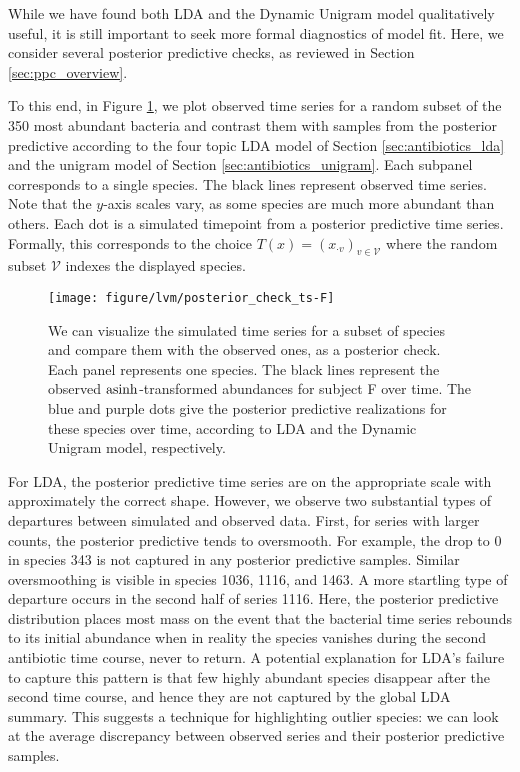 While we have found both LDA and the Dynamic Unigram model qualitatively useful,
it is still important to seek more formal diagnostics of model fit. Here, we
consider several posterior predictive checks, as reviewed in Section
\ref{sec:ppc_overview}.

To this end, in Figure \ref{fig:antibiotics_posterior_ts}, we plot observed time
series for a random subset of the 350 most abundant bacteria and contrast them
with samples from the posterior predictive according to the four topic LDA model
of Section \ref{sec:antibiotics_lda} and the unigram model of Section
\ref{sec:antibiotics_unigram}. Each subpanel corresponds to a single species. The
black lines represent observed time series. Note that the $y$-axis scales vary,
as some species are much more abundant than others. Each dot is a simulated
timepoint from a posterior predictive time series. Formally, this corresponds to
the choice $T\left(x\right) = \left(x_{\cdot v}\right)_{v \in \mathcal{V}}$
where the random subset $\mathcal{V}$ indexes the displayed species.

\begin{figure}
  \centering
  \texttt{[image: figure/lvm/posterior\_check\_ts-F]}
  \caption{We can visualize the simulated time series for a subset of species
    and compare them with the observed ones, as a posterior check. Each panel
    represents one species. The black lines represent the observed
    $\mathop\mathrm{asinh}$-transformed abundances for subject F over time. The blue and purple
    dots give the posterior predictive realizations for these species over time,
    according to LDA and the Dynamic Unigram model, respectively.
    \label{fig:antibiotics_posterior_ts}}
\end{figure}

For LDA, the posterior predictive time series are on the appropriate scale with
approximately the correct shape. However, we observe two substantial types of
departures between simulated and observed data. First, for series with larger
counts, the posterior predictive tends to oversmooth. For example, the drop to 0
in species 343 is not captured in any posterior predictive samples. Similar
oversmoothing is visible in species 1036, 1116, and 1463. A more startling type of
departure occurs in the second half of series 1116. Here, the posterior
predictive distribution places most mass on the event that the bacterial time
series rebounds to its initial abundance when in reality the species vanishes
during the second antibiotic time course, never to return. A potential
explanation for LDA's failure to capture this pattern is that few highly
abundant species disappear after the second time course, and hence they are not
captured by the global LDA summary. This suggests a technique for highlighting
outlier species: we can look at the average discrepancy between observed series
and their posterior predictive samples.

